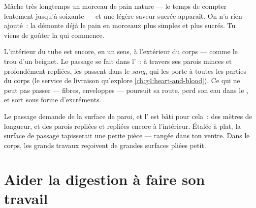 \begin{example}\label{ex:g4:journey-of-food:sweet}
Mâche très longtemps un morceau de pain nature --- le temps de
compter lentement jusqu'à soixante --- et une légère saveur sucrée
apparaît. On n'a rien ajouté~: la  démonte déjà le pain en
morceaux plus simples et plus sucrés. Tu viens de goûter la
 qui commence.
\end{example}

\begin{proposition}\label{prop:g4:journey-of-food:absorb}
L'intérieur du tube est encore, en un sens, à l'extérieur du corps
--- comme le trou d'un beignet. Le passage se fait dans
l'\emph{}~: à travers ses parois minces et profondément
repliées, les  passent dans le \emph{sang},
qui les porte à toutes les parties du corps (le service de livraison
qu'explore \cref{ch:g4:heart-and-blood}). Ce qui ne peut pas passer
--- fibres, enveloppes --- poursuit sa route, perd son eau dans le
, et sort sous forme d'excréments.
\end{proposition}
\admitted

\begin{remark}\label{rem:g4:journey-of-food:surface}
Le passage demande de la surface de paroi, et l' est
bâti pour cela~: des mètres de longueur, et des parois repliées et
repliées encore à l'intérieur. Étalée à plat, la surface de passage
tapisserait une petite pièce --- rangée dans ton ventre. Dans le
corps, les grands travaux reçoivent de grandes surfaces pliées
petit.
\end{remark}

\section{Aider la digestion à faire son travail}

